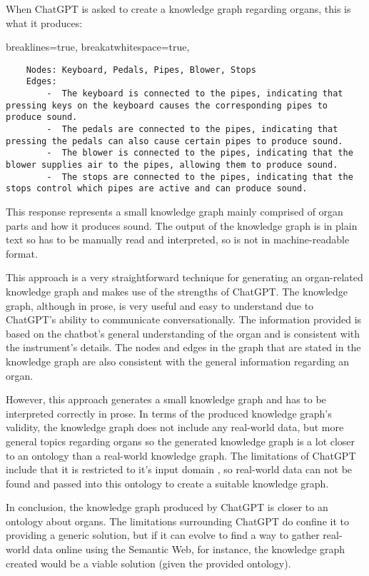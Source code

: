 When ChatGPT is asked to create a knowledge graph regarding organs, this is what it produces:

\lstset
{
    breaklines=true,
    breakatwhitespace=true,
}
\begin{lstlisting}
    Nodes: Keyboard, Pedals, Pipes, Blower, Stops
    Edges:
        -  The keyboard is connected to the pipes, indicating that pressing keys on the keyboard causes the corresponding pipes to produce sound.
        -  The pedals are connected to the pipes, indicating that pressing the pedals can also cause certain pipes to produce sound.
        -  The blower is connected to the pipes, indicating that the blower supplies air to the pipes, allowing them to produce sound.
        -  The stops are connected to the pipes, indicating that the stops control which pipes are active and can produce sound.
\end{lstlisting}

This response represents a small knowledge graph mainly comprised of organ parts and how it produces sound. The output of the knowledge graph is in plain text so has to be manually read and interpreted, so is not in machine-readable format. 

This approach is a very straightforward technique for generating an organ-related knowledge graph and makes use of the strengths of ChatGPT. The knowledge graph, although in prose, is very useful and easy to understand due to ChatGPT's ability to communicate conversationally. The information provided is based on the chatbot's general understanding of the organ and is consistent with the instrument's details. The nodes and edges in the graph that are stated in the knowledge graph are also consistent with the general information regarding an organ. 

However, this approach generates a small knowledge graph and has to be interpreted correctly in prose. In terms of the produced knowledge graph's validity, the knowledge graph does not include any real-world data, but more general topics regarding organs so the generated knowledge graph is a lot closer to an ontology than a real-world knowledge graph. The limitations of ChatGPT include that it is restricted to it's input domain \cite{chatgptwebsite}, so real-world data can not be found and passed into this ontology to create a suitable knowledge graph. 

In conclusion, the knowledge graph produced by ChatGPT is closer to an ontology about organs. The limitations surrounding ChatGPT do confine it to providing a generic solution, but if it can evolve to find a way to gather real-world data online using the Semantic Web, for instance, the knowledge graph created would be a viable solution (given the provided ontology).